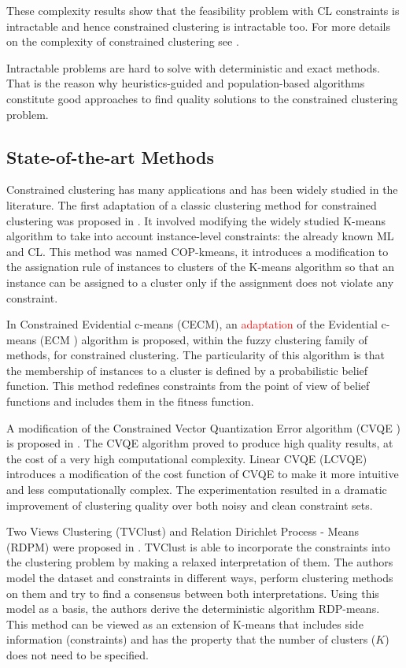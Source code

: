 \documentclass[review]{elsarticle}
\begin{document}
These complexity results show that the feasibility problem with CL constraints is intractable and hence constrained clustering is intractable too. For more details on the complexity of constrained clustering see \cite{davidson2005clustering}.

Intractable problems are hard to solve with deterministic and exact methods. That is the reason why heuristics-guided and population-based algorithms constitute good approaches to find quality solutions to the constrained clustering problem.

\subsection{State-of-the-art Methods} \label{sec:BackSOTA}

Constrained clustering has many applications and has been widely studied in the literature. The first adaptation of a classic clustering method for constrained clustering was proposed in \cite{wagstaff2001constrained}. It involved modifying the widely studied K-means algorithm to take into account instance-level constraints: the already known ML and CL. This method was named COP-kmeans, it introduces a modification to the assignation rule of instances to clusters of the K-means algorithm so that an instance can be assigned to a cluster only if the assignment does not violate any constraint.

In \cite{antoine2012cecm} Constrained Evidential c-means (CECM), an \textcolor{red}{adaptation} of the Evidential c-means (ECM \cite{masson2008ecm}) algorithm is proposed, within the fuzzy clustering family of methods, for constrained clustering. The particularity of this algorithm is that the membership of instances to a cluster is defined by a probabilistic belief function. This method redefines constraints from the point of view of belief functions and includes them in the fitness function.

A modification of the Constrained Vector Quantization Error algorithm (CVQE \cite{davidson2005clustering}) is proposed in \cite{pelleg2007k}. The CVQE algorithm proved to produce high quality results, at the cost of a very high computational complexity. Linear CVQE (LCVQE) introduces a modification of the cost function of CVQE to make it more intuitive and less computationally complex. The experimentation resulted in a dramatic improvement of clustering quality over both noisy and clean constraint sets.

Two Views Clustering (TVClust) and Relation Dirichlet Process - Means (RDPM) were proposed in \cite{khashabi2015clustering}. TVClust is able to incorporate the constraints into the clustering problem by making a relaxed interpretation of them. The authors model the dataset and constraints in different ways, perform clustering methods on them and try to find a consensus between both interpretations. Using this model as a basis, the authors derive the deterministic algorithm RDP-means. This method can be viewed as an extension of K-means that includes side information (constraints) and has the property that the number of clusters ($K$) does not need to be specified.
\end{document}
